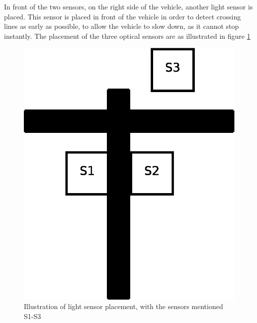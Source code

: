 \documentclass[final, english, a4paper]{article}
\begin{document}
	    In front of the two sensors, on the right side of the vehicle, another light sensor is placed.
	    This sensor is placed in front of the vehicle in order to detect crossing lines as early as possible, to allow
	    the vehicle to slow down, as it cannot stop instantly. The placement of the three optical sensors are as illustrated in figure \ref{fig:lightSensorPlacement}
	    \begin{figure}[htp]
            \centering
    	    \includegraphics[scale=0.45]{lightSensorPlacement}
	        \caption{Illustration of light sensor placement, with the sensors mentioned S1-S3}\label{fig:lightSensorPlacement}
        \end{figure}	      
\end{document}
